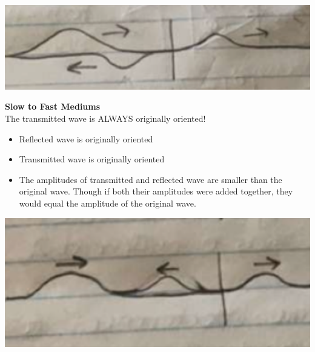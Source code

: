 \documentclass{article}
\begin{document}
\vspace{1pt}

\begin{adjustwidth}{1cm}{0pt}
    \includegraphics[scale=0.4]{images/fast_slow_wave}
\end{adjustwidth}\leavevmode

\vspace{2cm}

\noindent\textbf{Slow to Fast Mediums}\\
The transmitted wave is ALWAYS originally oriented!
\begin{itemize}
    \item Reflected wave is originally oriented
    \item Transmitted wave is originally oriented
    \item The amplitudes of transmitted and reflected wave are smaller than the original wave. Though if both their amplitudes were added together, they would equal the amplitude of the original wave.
\end{itemize}\leavevmode

\vspace{1pt}

\begin{adjustwidth}{1cm}{0pt}
    \includegraphics[scale=0.35]{images/slow_fast_wave}
\end{adjustwidth}\leavevmode

\vspace{3pt}
\end{document}
